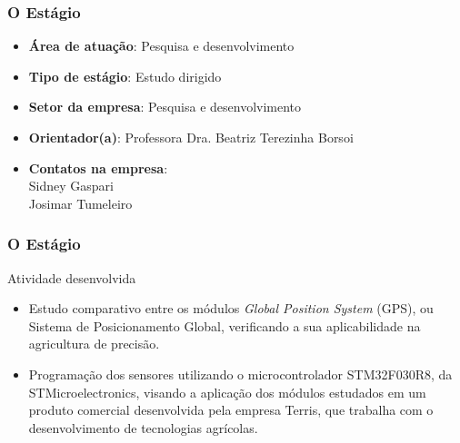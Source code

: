 \begin{frame}
\frametitle{O Estágio}

\begin{itemize}
	\item \textbf{Área de atuação}: Pesquisa e desenvolvimento
	\pause
	\item \textbf{Tipo de estágio}: Estudo dirigido
	\pause
	\item \textbf{Setor da empresa}: Pesquisa e desenvolvimento
	\pause	
	\item \textbf{Orientador(a)}: Professora Dra. Beatriz Terezinha Borsoi
	\pause
	\item \textbf{Contatos na empresa}: \\Sidney Gaspari\\ Josimar Tumeleiro
\end{itemize}
\end{frame}

\begin{frame}
\frametitle{O Estágio}

\begin{block}{Atividade desenvolvida}
\begin{itemize}
\item Estudo comparativo entre os módulos \textit{Global Position System} (GPS), ou Sistema de Posicionamento Global, verificando a sua aplicabilidade na agricultura de precisão.
\pause 
\item Programação dos sensores utilizando o microcontrolador STM32F030R8, da STMicroelectronics\textregistered, visando a aplicação dos módulos estudados em um produto comercial desenvolvida pela empresa Terris\textregistered, que trabalha com o desenvolvimento de tecnologias agrícolas.
\end{itemize}
\end{block}

\end{frame}


